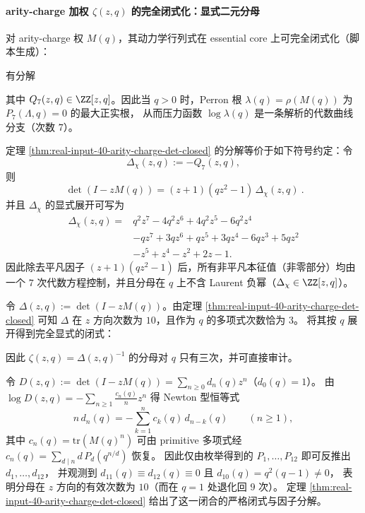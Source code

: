 \paragraph{arity-charge 加权 $\zeta(z,q)$ 的完全闭式化：显式二元分母}
对 arity-charge 权 $M(q)$，其动力学行列式在 essential core 上可完全闭式化（脚本生成）：
\begin{theorem}[两变量行列式闭式与代数压力（度 $7$）]\label{thm:real-input-40-arity-charge-det-closed}
有分解

其中 $Q_7(z,q)\in\ZZ[z,q]$。因此当 $q>0$ 时，Perron 根 $\lambda(q)=\rho(M(q))$ 为 $P_7(\Lambda,q)=0$ 的最大正实根，
从而压力函数 $\log\lambda(q)$ 是一条解析的代数曲线分支（次数 $7$）。
\end{theorem}

\begin{remark}\label{rem:real-input-40-arity-charge-delta-chi}
定理 \ref{thm:real-input-40-arity-charge-det-closed} 的分解等价于如下符号约定：令
\[
\Delta_\chi(z,q):=-Q_7(z,q),
\]
则
\[
\boxed{\ \det(I-zM(q))=(z+1)(qz^2-1)\,\Delta_\chi(z,q)\ }.
\]
并且 \(\Delta_\chi\) 的显式展开可写为
\[
\boxed{
\begin{aligned}
\Delta_\chi(z,q)
={}&q^2z^7-4q^2z^6+4q^2z^5-6q^2z^4\\
&-qz^7+3qz^6+qz^5+3qz^4-6qz^3+5qz^2\\
&-z^5+z^4-z^2+2z-1.
\end{aligned}}
\]
因此除去平凡因子 \((z+1)(qz^2-1)\) 后，所有非平凡本征值（非零部分）均由一个 \(7\) 次代数方程控制，并且分母在 \(q\) 上不含 Laurent 负幂（\(\Delta_\chi\in\ZZ[z,q]\)）。
\end{remark}

\begin{remark}\label{rem:real-input-40-arity-charge-det-q-cubic}
令 $\Delta(z,q):=\det(I-zM(q))$。由定理 \ref{thm:real-input-40-arity-charge-det-closed} 可知 $\Delta$ 在 $z$ 方向次数为 $10$，且作为 $q$ 的多项式次数恰为 $3$。
将其按 $q$ 展开得到完全显式的闭式：

因此 $\zeta(z,q)=\Delta(z,q)^{-1}$ 的分母对 $q$ 只有三次，并可直接审计。
\end{remark}

\begin{remark}\label{rem:real-input-40-arity-charge-newton}
令
\(
D(z,q):=\det(I-zM(q))=\sum_{n\ge 0}d_n(q)z^n
\)（$d_0(q)=1$）。
由
\(
\log D(z,q)=-\sum_{n\ge 1}\frac{c_n(q)}{n}z^n
\)
得 Newton 型恒等式
\[
n\,d_n(q)=-\sum_{k=1}^n c_k(q)\,d_{n-k}(q)\qquad(n\ge 1),
\]
其中 $c_n(q)=\mathrm{tr}(M(q)^n)$ 可由 primitive 多项式经
\(
c_n(q)=\sum_{d\mid n} d\,P_d\!\left(q^{n/d}\right)
\)
恢复。
因此仅由枚举得到的 $P_1,\dots,P_{12}$ 即可反推出 $d_1,\dots,d_{12}$，
并观测到 $d_{11}(q)\equiv d_{12}(q)\equiv 0$ 且 $d_{10}(q)=q^2(q-1)\neq 0$，
表明分母在 $z$ 方向的有效次数为 $10$（而在 $q=1$ 处退化回 $9$ 次）。
定理 \ref{thm:real-input-40-arity-charge-det-closed} 给出了这一闭合的严格闭式与因子分解。
\end{remark}

